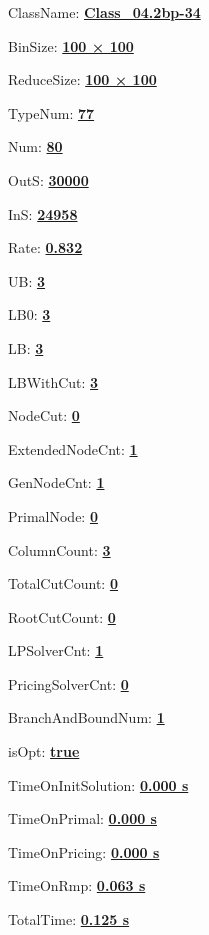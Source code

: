 \documentclass[11pt]{article}
\begin{document}
\pagestyle{empty}


ClassName: \underline{\textbf{Class_04.2bp-34}}
\par
BinSize: \underline{\textbf{100 × 100}}
\par
ReduceSize: \underline{\textbf{100 × 100}}
\par
TypeNum: \underline{\textbf{77}}
\par
Num: \underline{\textbf{80}}
\par
OutS: \underline{\textbf{30000}}
\par
InS: \underline{\textbf{24958}}
\par
Rate: \underline{\textbf{0.832}}
\par
UB: \underline{\textbf{3}}
\par
LB0: \underline{\textbf{3}}
\par
LB: \underline{\textbf{3}}
\par
LBWithCut: \underline{\textbf{3}}
\par
NodeCut: \underline{\textbf{0}}
\par
ExtendedNodeCnt: \underline{\textbf{1}}
\par
GenNodeCnt: \underline{\textbf{1}}
\par
PrimalNode: \underline{\textbf{0}}
\par
ColumnCount: \underline{\textbf{3}}
\par
TotalCutCount: \underline{\textbf{0}}
\par
RootCutCount: \underline{\textbf{0}}
\par
LPSolverCnt: \underline{\textbf{1}}
\par
PricingSolverCnt: \underline{\textbf{0}}
\par
BranchAndBoundNum: \underline{\textbf{1}}
\par
isOpt: \underline{\textbf{true}}
\par
TimeOnInitSolution: \underline{\textbf{0.000 s}}
\par
TimeOnPrimal: \underline{\textbf{0.000 s}}
\par
TimeOnPricing: \underline{\textbf{0.000 s}}
\par
TimeOnRmp: \underline{\textbf{0.063 s}}
\par
TotalTime: \underline{\textbf{0.125 s}}
\par
\newpage
\end{document}
